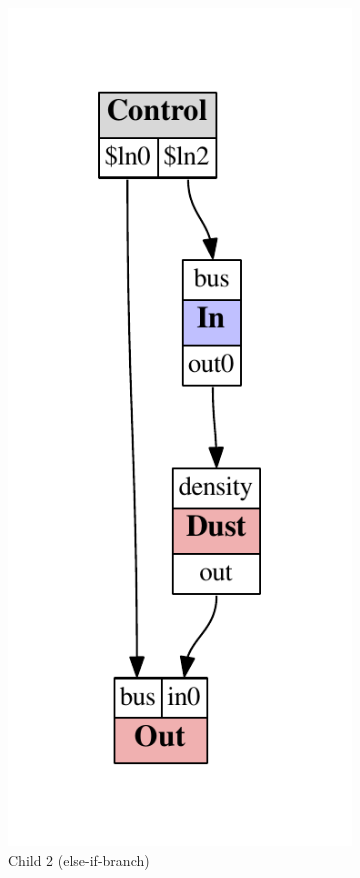 \documentclass[11pt,a4paper]{article}
\begin{document}
\begin{figure}
\begin{subfigure}[b]{0.3\textwidth}
\includegraphics[scale=0.5]{figures/ugen-if-mod-child_2.pdf}
\caption{Child 2 (else-if-branch)}\label{fig:ugen-mod-c2}
\end{subfigure}
\begin{subfigure}[b]{0.3\textwidth}%

\end{subfigure}
\end{figure}
\end{document}
